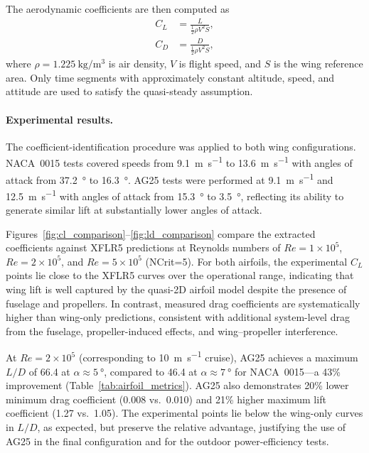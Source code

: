 The aerodynamic coefficients are then computed as
\begin{align}
C_L &= \frac{L}{\frac{1}{2}\rho V^2 S}, \label{eq:CL_definition} \\
C_D &= \frac{D}{\frac{1}{2}\rho V^2 S}, \label{eq:CD_definition}
\end{align}
where $\rho = \SI{1.225}{\kilogram\per\meter\cubed}$ is air density, $V$ is flight speed, and $S$ is the wing reference area.
Only time segments with approximately constant altitude, speed, and attitude are used to satisfy the quasi-steady assumption.

\paragraph{Experimental results.}
The coefficient-identification procedure was applied to both wing configurations.
NACA~0015 tests covered speeds from \SI{9.1}{\meter\per\second} to \SI{13.6}{\meter\per\second} with angles of attack from \SI{37.2}{\degree} to \SI{16.3}{\degree}.
AG25 tests were performed at \SI{9.1}{\meter\per\second} and \SI{12.5}{\meter\per\second} with angles of attack from \SI{15.3}{\degree} to \SI{3.5}{\degree}, reflecting its ability to generate similar lift at substantially lower angles of attack.

Figures~\ref{fig:cl_comparison}--\ref{fig:ld_comparison} compare the extracted coefficients against XFLR5 predictions at Reynolds numbers of $Re=1\times10^5$, $Re=2\times10^5$, and $Re=5\times10^5$ (NCrit=5).
For both airfoils, the experimental $C_L$ points lie close to the XFLR5 curves over the operational range, indicating that wing lift is well captured by the quasi-2D airfoil model despite the presence of fuselage and propellers.
In contrast, measured drag coefficients are systematically higher than wing-only predictions, consistent with additional system-level drag from the fuselage, propeller-induced effects, and wing--propeller interference.

At $Re=2\times10^5$ (corresponding to \SI{10}{\meter\per\second} cruise), AG25 achieves a maximum $L/D$ of 66.4 at $\alpha \approx \SI{5}{\degree}$, compared to 46.4 at $\alpha \approx \SI{7}{\degree}$ for NACA~0015---a 43\% improvement (Table~\ref{tab:airfoil_metrics}).
AG25 also demonstrates 20\% lower minimum drag coefficient (0.008 vs.\ 0.010) and 21\% higher maximum lift coefficient (1.27 vs.\ 1.05).
The experimental points lie below the wing-only curves in $L/D$, as expected, but preserve the relative advantage, justifying the use of AG25 in the final configuration and for the outdoor power-efficiency tests.

